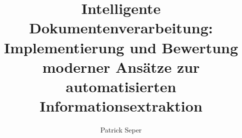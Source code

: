 \documentclass[bachelor,german,smartquotes]{hgbthesis}
\begin{document}


\title{Intelligente Dokumentenverarbeitung: Implementierung und Bewertung moderner Ansätze zur automatisierten Informationsextraktion}
\author{Patrick Seper}





\frontmatter                                       %

\maketitle
\tableofcontents

		
			

\mainmatter                             %










\appendix                                                               %
\end{document}
